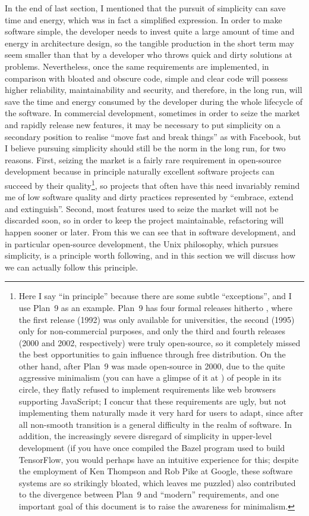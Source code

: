 In the end of last section, I mentioned that the pursuit of simplicity can
save time and energy, which was in fact a simplified expression.  In order to
make software simple, the developer needs to invest quite a large amount of time
and energy in architecture design, so the tangible production in the short term
may seem smaller than that by a developer who throws quick and dirty solutions
at problems.  Nevertheless, once the same requirements are implemented, in
comparison with bloated and obscure code, simple and clear code will possess
higher reliability, maintainability and security, and therefore, in the long
run, will save the time and energy consumed by the developer during the whole
lifecycle of the software.  In commercial development, sometimes in order to
seize the market and rapidly release new features, it may be necessary to put
simplicity on a secondary position to realise ``move fast and break things''
as with Facebook, but I believe pursuing simplicity should still be the norm
in the long run, for two reasons.  First, seizing the market is a fairly rare
requirement in open-source development because in principle naturally excellent
software projects can succeed by their quality\footnote{\label{fn:plan9}Here
I say ``in principle'' because there are some subtle ``exceptions'', and
I use Plan~9 as an example.  Plan~9 has four formal releases hitherto%
, where the first release (1992) was only available for
universities, the second (1995) only for non-commercial purposes, and only the
third and fourth releases (2000 and 2002, respectively) were truly open-source,
so it completely missed the best opportunities to gain influence through free
distribution.  On the other hand, after Plan~9 was made open-source in 2000,
due to the quite aggressive minimalism (you can have a glimpse of it at
\parencite{catv:hsoft}) of people in its circle, they flatly refused to
implement requirements like web browsers supporting JavaScript; I concur
that these requirements are ugly, but not implementing them naturally made
it very hard for users to adapt, since after all non-smooth transition is
a general difficulty in the realm of software.  In addition, the increasingly
severe disregard of simplicity in upper-level development (if you have once
compiled the Bazel program used to build TensorFlow, you would perhaps have an
intuitive experience for this; despite the employment of Ken Thompson and Rob
Pike \etal{} at Google, these software systems are so strikingly bloated, which
leaves me puzzled) also contributed to the divergence between Plan~9 and
``modern'' requirements, and one important goal of this document is to raise
the awareness for minimalism.}, so projects that often have this need invariably
remind me of low software quality and dirty practices represented by ``embrace,
extend and extinguish''.  Second, most features used to seize the market
will not be discarded soon, so in order to keep the project maintainable,
refactoring will happen sooner or later.  From this we can see that in software
development, and in particular open-source development, the Unix philosophy,
which pursues simplicity, is a principle worth following, and in this
section we will discuss how we can actually follow this principle.

